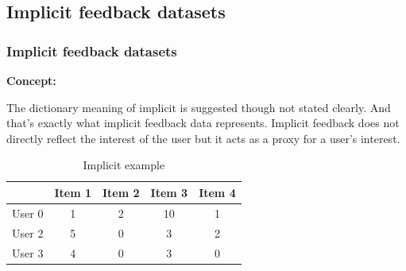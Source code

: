 \subsection{Implicit feedback datasets}
\begin{frame}
\frametitle{Implicit feedback datasets}
\hspace{-0.5cm}
{\Large \textbf{Concept:}\par}
\vspace{3mm}
The dictionary meaning of implicit is suggested though not stated clearly. And that’s exactly what implicit feedback data represents. Implicit feedback does not directly reflect the interest of the user but it acts as a proxy for a user’s interest.
\vspace{0.2cm}
\begin{center}
\begin{table}
    \centering
    \begin{tabular}{|c|c|c|c|c|} \hline
         & Item 1 & Item 2 & Item 3 & Item 4  \\ \hline
         User 0 & 1 & 2 & 10 & 1  \\ \hline
         User 2 &  5  &  0  &  3  & 2   \\ \hline
         User 3 & 4 &  0  & 3 &  0\\ \hline
    \end{tabular}
    \caption{Implicit example}
\end{table}
\end{center}
\end{frame}

